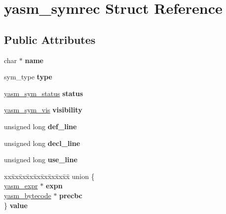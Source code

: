 \hypertarget{structyasm__symrec}{\section{yasm\-\_\-symrec Struct Reference}
\label{structyasm__symrec}
}
\subsection*{Public Attributes}
\begin{DoxyCompactItemize}
\item 
\hypertarget{structyasm__symrec_aa77b1492a22b77e2aaa0857f29ffbab2}{char $\ast$ {\bfseries name}}\label{structyasm__symrec_aa77b1492a22b77e2aaa0857f29ffbab2}

\item 
\hypertarget{structyasm__symrec_ab761c4a8850500f6a37e36bdb4da0a96}{sym\-\_\-type {\bfseries type}}\label{structyasm__symrec_ab761c4a8850500f6a37e36bdb4da0a96}

\item 
\hypertarget{structyasm__symrec_a6af66d289d567c3407f5edcc977e5dc8}{\hyperlink{symrec_8h_a4e830242184849024c9c8147a0d06ae8}{yasm\-\_\-sym\-\_\-status} {\bfseries status}}\label{structyasm__symrec_a6af66d289d567c3407f5edcc977e5dc8}

\item 
\hypertarget{structyasm__symrec_ab31b976e930e923660f81787c9afe114}{\hyperlink{symrec_8h_abcd4561bf31998e92b7b681e6355fbae}{yasm\-\_\-sym\-\_\-vis} {\bfseries visibility}}\label{structyasm__symrec_ab31b976e930e923660f81787c9afe114}

\item 
\hypertarget{structyasm__symrec_a8ab73194a26dd90e730a8ae05727c6bf}{unsigned long {\bfseries def\-\_\-line}}\label{structyasm__symrec_a8ab73194a26dd90e730a8ae05727c6bf}

\item 
\hypertarget{structyasm__symrec_a94df924acd0bffbd5292062a32930003}{unsigned long {\bfseries decl\-\_\-line}}\label{structyasm__symrec_a94df924acd0bffbd5292062a32930003}

\item 
\hypertarget{structyasm__symrec_aafbbb0e457f836070c9329f24b2aa989}{unsigned long {\bfseries use\-\_\-line}}\label{structyasm__symrec_aafbbb0e457f836070c9329f24b2aa989}

\item 
\hypertarget{structyasm__symrec_a193d606f35b71d1f2af376519191d338}{\begin{tabbing}
xx\=xx\=xx\=xx\=xx\=xx\=xx\=xx\=xx\=\kill
union \{\\
\hypertarget{unionyasm__symrec_1_1@5_ad13bf415017da4fa181041b4d0a96d0f}{\>\hyperlink{structyasm__expr}{yasm\_expr} $\ast$ {\bfseries expn}\\
\hypertarget{unionyasm__symrec_1_1@5_a4570398d2ebcb1fc3ad5fbb380b94135}{\>\hyperlink{structyasm__bytecode}{yasm\_bytecode} $\ast$ {\bfseries precbc}\\
\} {\bfseries value}}\label{structyasm__symrec_a193d606f35b71d1f2af376519191d338}
\\

}
\end{tabbing}}
\end{DoxyCompactItemize}
